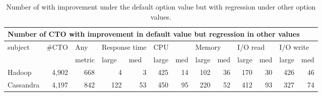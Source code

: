 \begin{table}[t]
\tabcolsep=0.08cm
\caption{Number of \instance with improvement under the default option value but with regression under other option values.}
    \begin{tabular}{|l|l|l|l|r|l|r|l|r|l|r|l|r|}
    \hline
    \multicolumn{13}{|l|}{Number of CTO with improvement in default value but regression   in other values}                                                                                                                                                                                                                                                        \\ \hline
    \multirow{2}{*}{subject} & \multirow{2}{*}{\#CTO}     & Any                      & \multicolumn{2}{l|}{Response time}                  & \multicolumn{2}{l|}{CPU}                            & \multicolumn{2}{l|}{Memory}                         & \multicolumn{2}{l|}{I/O read}                       & \multicolumn{2}{l|}{I/O write}                      \\ \cline{4-13} 
                             &                            & metric                   & large                    & \multicolumn{1}{l|}{med} & large                    & \multicolumn{1}{l|}{med} & large                    & \multicolumn{1}{l|}{med} & large                    & \multicolumn{1}{l|}{med} & large                    & \multicolumn{1}{l|}{med} \\ \hline
    Hadoop                   & \multicolumn{1}{r|}{4,902} & \multicolumn{1}{r|}{668} & \multicolumn{1}{r|}{4}   & 3                        & \multicolumn{1}{r|}{425} & 14                       & \multicolumn{1}{r|}{102} & 36                       & \multicolumn{1}{r|}{170} & 30                       & \multicolumn{1}{r|}{426} & 46                       \\ \hline
    Cassandra                & \multicolumn{1}{r|}{4,197} & \multicolumn{1}{r|}{842} & \multicolumn{1}{r|}{122} & 53                       & \multicolumn{1}{r|}{450} & 95                       & \multicolumn{1}{r|}{220} & 52                       & \multicolumn{1}{r|}{412} & 93                       & \multicolumn{1}{r|}{327} & 74                       \\ \hline
    \end{tabular}
\label{tab:option_improvement_default}
\end{table}

